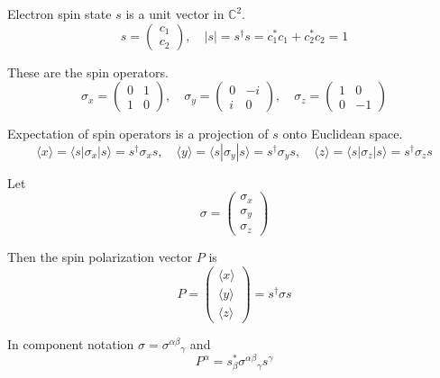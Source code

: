\documentclass[12pt]{article}
\begin{document}
Electron spin state $s$ is a unit vector in $\mathbb{C}^2$.
\begin{equation*}
s=\begin{pmatrix}c_1\\c_2\end{pmatrix},
\quad
|s|=s^\dag s=c_1^*c_1+c_2^*c_2=1
\end{equation*}

These are the spin operators.
\begin{equation*}
\sigma_x=\begin{pmatrix}0&1\\1&0\end{pmatrix},
\quad
\sigma_y=\begin{pmatrix}0&-i\\i&0\end{pmatrix},
\quad
\sigma_z=\begin{pmatrix}1&0\\0&-1\end{pmatrix}
\end{equation*}

Expectation of spin operators is a projection of $s$ onto Euclidean space.
\begin{equation*}
\langle x\rangle=\langle s|\sigma_x|s\rangle=s^\dag\sigma_x s,
\quad
\langle y\rangle=\langle s|\sigma_y|s\rangle=s^\dag\sigma_y s,
\quad
\langle z\rangle=\langle s|\sigma_z|s\rangle=s^\dag\sigma_z s
\end{equation*}

Let
\begin{equation*}
\sigma=\begin{pmatrix}\sigma_x\\\sigma_y\\\sigma_z\end{pmatrix}
\end{equation*}

Then the spin polarization vector $P$ is
\begin{equation*}
P=\begin{pmatrix}\langle x\rangle\\\langle y\rangle\\\langle z\rangle\end{pmatrix}
=s^\dag\sigma s
\end{equation*}

In component notation $\sigma=\sigma^{\alpha\beta}{}_\gamma$ and
\begin{equation*}
P^\alpha=s_\beta^*\sigma^{\alpha\beta}{}_\gamma s^\gamma
\end{equation*}
\end{document}

